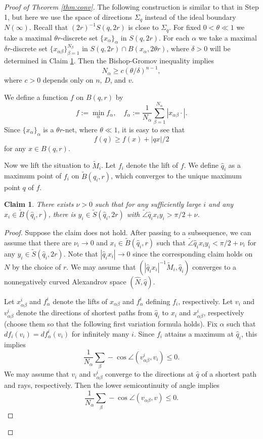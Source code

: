 \documentclass[a4paper,12pt]{amsart}
\theoremstyle{plain}
\newtheorem{clm}[thm]{Claim}
\theoremstyle{definition}
\numberwithin{thm}{section}
\numberwithin{equation}{section}
\begin{document}
\begin{proof}[Proof of Theorem \ref{thm:conv}]
The following construction is similar to that in Step 1, but here we use the space of directions $\Sigma_q$ instead of the ideal boundary $N(\infty)$.
Recall that $(2r)^{-1}S(q,2r)$ is close to $\Sigma_q$.
For fixed $0<\theta\ll 1$ we take a maximal $\theta r$-discrete set $\{x_\alpha\}_\alpha$ in $S(q,2r)$.
For each $\alpha$ we take a maximal $\delta r$-discrete set $\{x_{\alpha\beta}\}_{\beta=1}^{N_\beta}$ in $S(q,2r)\cap B(x_\alpha,2\theta r)$, where $\delta>0$ will be determined in Claim \ref{clm:stab}.
Then the Bishop-Gromov inequality implies
\begin{equation}\label{eq:low}
N_\alpha\ge c\left(\theta/\delta\right)^{n-1},
\end{equation}
where $c>0$ depends only on $n$, $D$, and $v$.

We define a function $f$ on $B(q,r)$ by
\[f:=\min_\alpha f_\alpha,\quad f_\alpha:=\frac1{N_\alpha}\sum_{\beta=1}^{N_\alpha}|x_{\alpha\beta}\cdot|.\]
Since $\{x_\alpha\}_\alpha$ is a $\theta r$-net, where $\theta\ll1$, it is easy to see that
\[f(q)\ge f(x)+|qx|/2\]
for any $x\in B(q,r)$.

Now we lift the situation to $\tilde M_i$.
Let $f_i$ denote the lift of $f$.
We define $\hat q_i$ as a maximum point of $f_i$ on $\tilde B(q_i,r)$, which converges to the unique maximum point $q$ of $f$.

\begin{clm}\label{clm:stab}
There exists $\nu>0$ such that for any sufficiently large $i$ and any $x_i\in\tilde B(\hat q_i,r)$, there is $y_i\in\tilde S(\hat q_i,2r)$ with $\tilde\angle\hat q_ix_iy_i>\pi/2+\nu$.
\end{clm}

\begin{proof}
Suppose the claim does not hold.
After passing to a subsequence, we can assume that there are $\nu_i\to 0$ and $x_i\in\tilde B(\hat q_i,r)$ such that $\tilde\angle\hat q_ix_iy_i<\pi/2+\nu_i$  for any $y_i\in\tilde S(\hat q_i,2r)$.
Note that $|\hat q_ix_i|\to 0$ since the corresponding claim holds on $N$ by the choice of $r$.
We may assume that $(|\hat q_ix_i|^{-1}\tilde M_i,\hat q_i)$ converges to a nonnegatively curved Alexandrov space $(\hat N,\hat q)$.

Let $x_{\alpha\beta}^i$ and $f_\alpha^i$ denote the lifts of $x_{\alpha\beta}$ and $f_\alpha^i$ defining $f_i$, respectively.
Let $v_i$ and $v_{\alpha\beta}^i$ denote the directions of shortest paths from $\hat q_i$ to $x_i$ and $x_{\alpha\beta}^i$, respectively (choose them so that the following first variation formula holds).
Fix $\alpha$ such that $df_i(v_i)=df_\alpha^i(v_i)$ for infinitely many $i$.
Since $f_i$ attains a maximum at $\hat q_i$, this implies
\[\frac1{N_\alpha}\sum_\beta-\cos\angle(v_{\alpha\beta}^i,v_i)\le 0.\]
We may assume that $v_i$ and $v_{\alpha\beta}^i$ converge to the directions at $\hat q$ of a shortest path and rays, respectively.
Then the lower semicontinuity of angle implies
\begin{equation}\label{eq:up}
\frac1{N_\alpha}\sum_\beta-\cos\angle(v_{\alpha\beta},v)\le 0.
\end{equation}


\end{proof}
\end{proof}
\end{document}
